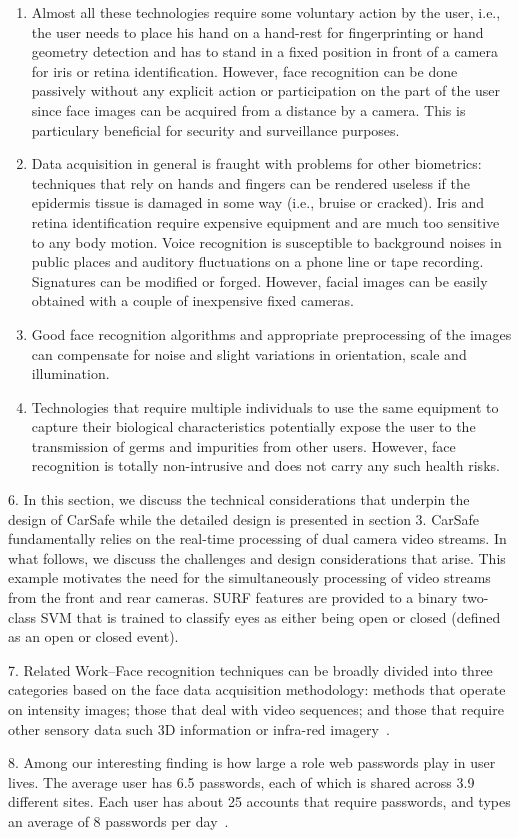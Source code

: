 \begin{enumerate}
    \item Almost all these technologies require some voluntary action by the user, i.e., the user needs to place his hand on a hand-rest for fingerprinting or hand geometry detection and has to stand in a fixed position in front of a camera for iris or retina identification. However, face recognition can be done passively without any explicit action or participation on the part of the user since face images can be acquired from a distance by a camera. This is particulary beneficial for security and surveillance purposes.
    \item Data acquisition in general is fraught with problems for other biometrics: techniques that rely on hands and fingers can be rendered useless if the epidermis tissue is damaged in some way (i.e., bruise or cracked). Iris and retina identification require expensive equipment and are much too sensitive to any body motion. Voice recognition is susceptible to background noises in public places and auditory fluctuations on a phone line or tape recording. Signatures can be modified or forged. However, facial images can be easily obtained with a couple of inexpensive fixed cameras.
    \item Good face recognition algorithms and appropriate preprocessing of the images can compensate for noise and slight variations in orientation, scale and illumination.
    \item Technologies that require multiple individuals to use the same equipment to capture their biological characteristics potentially expose the user to the transmission of germs and impurities from other users. However, face recognition is totally non-intrusive and does not carry any such health risks.
\end{enumerate}

6. In this section, we discuss the technical considerations that underpin the design of CarSafe while the detailed design is presented in section 3.  CarSafe fundamentally relies on the real-time processing of dual camera video streams. In what follows, we discuss the challenges and design considerations that arise.  This example motivates the need for the simultaneously processing of video streams from the front and rear cameras. SURF features are provided to a binary two-class SVM that is trained to classify eyes as either being open or closed (defined as an open or closed event).

7. Related Work--Face recognition techniques can be broadly divided into three categories based on the face data acquisition methodology: methods that operate on intensity images; those that deal with video sequences; and those that require other sensory data such 3D information or infra-red imagery~\cite{Jafri2009A}.

8. Among our interesting finding is how large a role web passwords play in user lives. The average user has 6.5 passwords, each of which is shared across 3.9 different sites. Each user has about 25 accounts that require passwords, and types an average of 8 passwords per day~\cite{florencio2007}.
